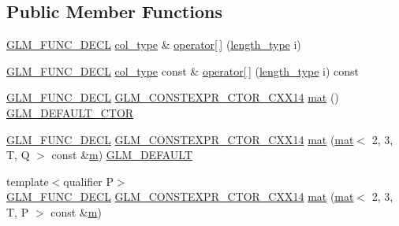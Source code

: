 \subsection*{Public Member Functions}
\begin{DoxyCompactItemize}
\item 
\hyperlink{setup_8hpp_ab2d052de21a70539923e9bcbf6e83a51}{G\+L\+M\+\_\+\+F\+U\+N\+C\+\_\+\+D\+E\+CL} \hyperlink{structglm_1_1mat_3_012_00_013_00_01_t_00_01_q_01_4_aebe4faf14ea1bc3092b4bbf591d7194e}{col\+\_\+type} \& \hyperlink{structglm_1_1mat_3_012_00_013_00_01_t_00_01_q_01_4_a946520cc2889c97e6841cbf5c36ee715}{operator\mbox{[}$\,$\mbox{]}} (\hyperlink{structglm_1_1mat_3_012_00_013_00_01_t_00_01_q_01_4_ad2e2433ba375abcd6bada873f8ea2de1}{length\+\_\+type} i)
\item 
\hyperlink{setup_8hpp_ab2d052de21a70539923e9bcbf6e83a51}{G\+L\+M\+\_\+\+F\+U\+N\+C\+\_\+\+D\+E\+CL} \hyperlink{structglm_1_1mat_3_012_00_013_00_01_t_00_01_q_01_4_aebe4faf14ea1bc3092b4bbf591d7194e}{col\+\_\+type} const  \& \hyperlink{structglm_1_1mat_3_012_00_013_00_01_t_00_01_q_01_4_abef4a7f73eb38bb050aad6894e1189d8}{operator\mbox{[}$\,$\mbox{]}} (\hyperlink{structglm_1_1mat_3_012_00_013_00_01_t_00_01_q_01_4_ad2e2433ba375abcd6bada873f8ea2de1}{length\+\_\+type} i) const
\item 
\hyperlink{setup_8hpp_ab2d052de21a70539923e9bcbf6e83a51}{G\+L\+M\+\_\+\+F\+U\+N\+C\+\_\+\+D\+E\+CL} \hyperlink{setup_8hpp_a0900f9145e68bf6061b6f5e7be3fa751}{G\+L\+M\+\_\+\+C\+O\+N\+S\+T\+E\+X\+P\+R\+\_\+\+C\+T\+O\+R\+\_\+\+C\+X\+X14} \hyperlink{structglm_1_1mat_3_012_00_013_00_01_t_00_01_q_01_4_a895bbb293e0af4e6f3fdc032e736e4eb}{mat} () \hyperlink{setup_8hpp_afb97a4e995bc004c0cbbfa22125b80ba}{G\+L\+M\+\_\+\+D\+E\+F\+A\+U\+L\+T\+\_\+\+C\+T\+OR}
\item 
\hyperlink{setup_8hpp_ab2d052de21a70539923e9bcbf6e83a51}{G\+L\+M\+\_\+\+F\+U\+N\+C\+\_\+\+D\+E\+CL} \hyperlink{setup_8hpp_a0900f9145e68bf6061b6f5e7be3fa751}{G\+L\+M\+\_\+\+C\+O\+N\+S\+T\+E\+X\+P\+R\+\_\+\+C\+T\+O\+R\+\_\+\+C\+X\+X14} \hyperlink{structglm_1_1mat_3_012_00_013_00_01_t_00_01_q_01_4_a6b574b8414d3902192ded677b5476562}{mat} (\hyperlink{structglm_1_1mat}{mat}$<$ 2, 3, T, Q $>$ const \&\hyperlink{_s_d_l__opengl__glext_8h_af593500c283bf1a787a6f947f503a5c2}{m}) \hyperlink{setup_8hpp_aefce7051c376a64ba89fa93a9f63bc2c}{G\+L\+M\+\_\+\+D\+E\+F\+A\+U\+LT}
\item 
{\footnotesize template$<$qualifier P$>$ }\\\hyperlink{setup_8hpp_ab2d052de21a70539923e9bcbf6e83a51}{G\+L\+M\+\_\+\+F\+U\+N\+C\+\_\+\+D\+E\+CL} \hyperlink{setup_8hpp_a0900f9145e68bf6061b6f5e7be3fa751}{G\+L\+M\+\_\+\+C\+O\+N\+S\+T\+E\+X\+P\+R\+\_\+\+C\+T\+O\+R\+\_\+\+C\+X\+X14} \hyperlink{structglm_1_1mat_3_012_00_013_00_01_t_00_01_q_01_4_abeb4c8e27fcf703c9944917ee1a10887}{mat} (\hyperlink{structglm_1_1mat}{mat}$<$ 2, 3, T, P $>$ const \&\hyperlink{_s_d_l__opengl__glext_8h_af593500c283bf1a787a6f947f503a5c2}{m})

\end{DoxyCompactItemize}
